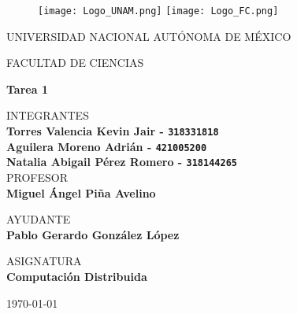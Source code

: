 \thispagestyle{empty}

\begin{figure}[ht]
  \texttt{[image: Logo\_UNAM.png]}
  \label{EscudoUNAM}
  \endminipage
  \texttt{[image: Logo\_FC.png]}
  \label{EscudoFC}
  \endminipage
\end{figure}

\begin{center}
  \vspace{0.8cm}
  \LARGE
  UNIVERSIDAD NACIONAL AUTÓNOMA DE MÉXICO 
  
  \vspace{0.7cm}
  \LARGE
  FACULTAD DE CIENCIAS
  
  \vspace{0.8 cm}	
  \Large
  \textbf{Tarea 1}

  \vspace{0.8 cm}
  \normalsize	
  INTEGRANTES \\
  \vspace{.2cm}
  \large
  \textbf{Torres Valencia Kevin Jair - \texttt{318331818}}\\
  \textbf{Aguilera Moreno Adrián - \texttt{421005200}}\\
  \textbf{Natalia Abigail Pérez Romero  - \texttt{318144265}}\\
  
  \vspace{1 cm}
  \normalsize	
  PROFESOR \\
  \vspace{.2cm}
  \large
  \textbf{Miguel Ángel Piña Avelino}
  
  \vspace{1 cm}
  AYUDANTE \\
  \vspace{.2cm}
  \large
  \textbf{Pablo Gerardo González López}
  \vspace{1.3cm}
  
  \normalsize	
  ASIGNATURA \\
  \vspace{.2cm}
  \large
  \textbf{Computación Distribuida}
  
  \vspace{1 cm}
  \today
\end{center}
